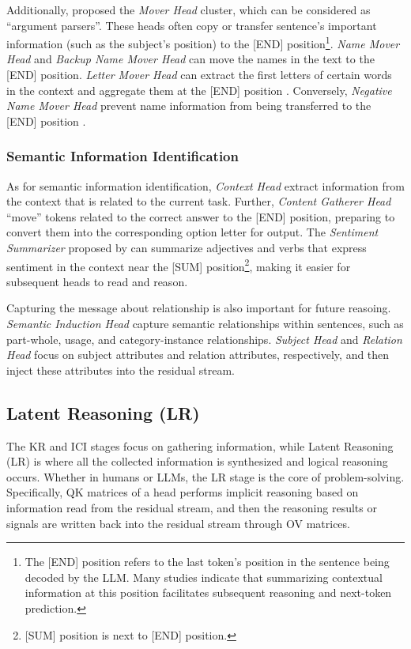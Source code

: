 \documentclass{article}
\begin{document}
Additionally, \citet{KnowledgeCircuit_24_arXiv_ZJU} proposed the \textit{Mover Head} cluster, which can be considered as ``argument parsers''. These heads often copy or transfer sentence's important information (such as the subject's position) to the [END] position\footnote{The [END] position refers to the last token's position in the sentence being decoded by the LLM. Many studies indicate that summarizing contextual information at this position facilitates subsequent reasoning and next-token prediction.}.
\textit{Name Mover Head} and \textit{Backup Name Mover Head} can move the names in the text to the [END] position.
\textit{Letter Mover Head} can extract the first letters of certain words in the context and aggregate them at the [END] position \citep{AcronymPredict_24_arXiv_Alicante}.
Conversely, \textit{Negative Name Mover Head} prevent name information from being transferred to the [END] position \citep{IOI_23_ICLR_Redwood,CopySupression_23_arXiv_Google}.

\subsubsection{Semantic Information Identification} \label{subsubsec:semantic}
As for semantic information identification,
\textit{Context Head} \citep{KnowledgeConflict_24_arXiv_UCAS} extract information from the context that is related to the current task.
Further, \textit{Content Gatherer Head} \citep{CorrectLetterHead_23_arXiv_DeepMind,ColorObject_24_ICLR_BrownU} ``move'' tokens related to the correct answer to the [END] position, preparing to convert them into the corresponding option letter for output.
The \textit{Sentiment Summarizer} proposed by \citet{Sentiment_23_arXiv_EleutherAI} can summarize adjectives and verbs that express sentiment in the context near the [SUM] position\footnote{[SUM] position is next to [END] position.}, making it easier for subsequent heads to read and reason.

Capturing the message about relationship is also important for future reasoing. \textit{Semantic Induction Head} \citep{Semantic_24_arXiv_SJTU} capture semantic relationships within sentences, such as part-whole, usage, and category-instance relationships.
\textit{Subject Head} and \textit{Relation Head} \citep{FactualRecall_24_arXiv_Independent} focus on subject attributes and relation attributes, respectively, and then inject these attributes into the residual stream.

\subsection{Latent Reasoning (LR)} \label{subsec:LR}
The KR and ICI stages focus on gathering information, while Latent Reasoning (LR) is where all the collected information is synthesized and logical reasoning occurs. Whether in humans or LLMs, the LR stage is the core of problem-solving. Specifically, QK matrices of a head performs implicit reasoning based on information read from the residual stream, and then the reasoning results or signals are written back into the residual stream through OV matrices.
\end{document}
